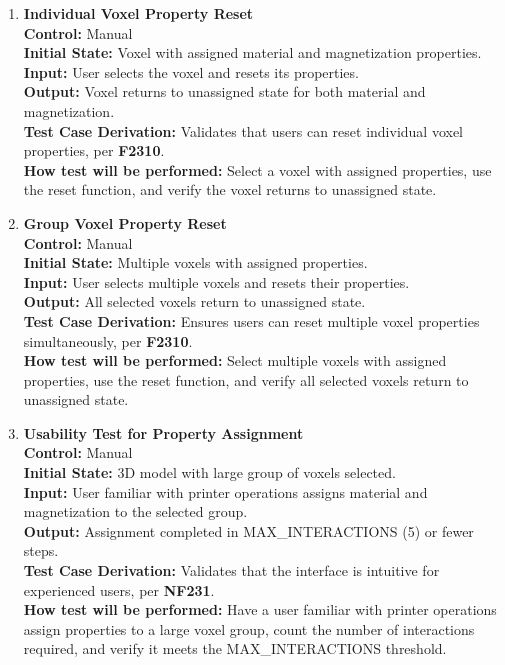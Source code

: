 \documentclass[12pt, titlepage]{article}
\begin{document}
\begin{enumerate}
  \item \textbf{Individual Voxel Property Reset} \\[2mm]
    \textbf{Control:} Manual \\ 
    \textbf{Initial State:} Voxel with assigned material and magnetization properties. \\ 
    \textbf{Input:} User selects the voxel and resets its properties. \\ 
    \textbf{Output:} Voxel returns to unassigned state for both material and magnetization. \\[2mm]
    \textbf{Test Case Derivation:} Validates that users can reset individual voxel properties, per \textbf{F2310}. \\[2mm]
    \textbf{How test will be performed:} Select a voxel with assigned properties, use the reset function, and verify the voxel returns to unassigned state.

  \item \textbf{Group Voxel Property Reset} \\[2mm]
    \textbf{Control:} Manual \\ 
    \textbf{Initial State:} Multiple voxels with assigned properties. \\ 
    \textbf{Input:} User selects multiple voxels and resets their properties. \\ 
    \textbf{Output:} All selected voxels return to unassigned state. \\[2mm]
    \textbf{Test Case Derivation:} Ensures users can reset multiple voxel properties simultaneously, per \textbf{F2310}. \\[2mm]
    \textbf{How test will be performed:} Select multiple voxels with assigned properties, use the reset function, and verify all selected voxels return to unassigned state.

  \item \textbf{Usability Test for Property Assignment} \\[2mm]
    \textbf{Control:} Manual \\ 
    \textbf{Initial State:} 3D model with large group of voxels selected. \\ 
    \textbf{Input:} User familiar with printer operations assigns material and magnetization to the selected group. \\ 
    \textbf{Output:} Assignment completed in MAX\_INTERACTIONS (5) or fewer steps. \\[2mm]
    \textbf{Test Case Derivation:} Validates that the interface is intuitive for experienced users, per \textbf{NF231}. \\[2mm]
    \textbf{How test will be performed:} Have a user familiar with printer operations assign properties to a large voxel group, count the number of interactions required, and verify it meets the MAX\_INTERACTIONS threshold.


\end{enumerate}
\end{document}
